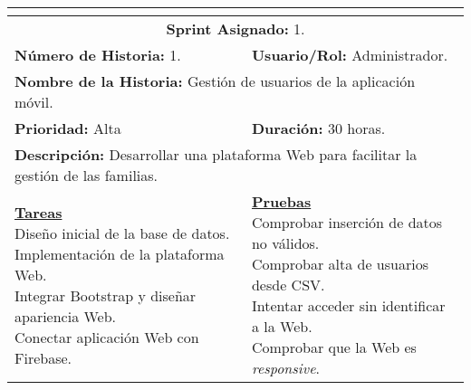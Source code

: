 \resizebox{15cm}{!} {
	\begin{tabular}{|l|l|}
		\hline
		\multicolumn{2}{|c|}{\cellcolor[HTML]{343434}{\color[HTML]{FFFFFF} \textbf{Historia de Usuario}}} \\
		\hline
		\multicolumn{2}{|c|}{\textbf{Sprint Asignado:} 1.} \\
		\hline
		\textbf{Número de Historia:} 1. & \textbf{Usuario/Rol:} Administrador.\\
		\hline
		\multicolumn{2}{|l|}{\textbf{Nombre de la Historia:} Gestión de usuarios de la aplicación móvil.} \\
		\hline
		\textbf{Prioridad:} Alta & \textbf{Duración:} 30 horas.\\
		\hline
		\multicolumn{2}{|l|}{\textbf{Descripción:} Desarrollar una plataforma Web para facilitar la gestión de las familias.} \\
		\hline
		\specialcell{\underline{\textbf{Tareas}} \\ Diseño inicial de la base de datos. \\ Implementación de la plataforma Web. \\ Integrar Bootstrap y diseñar apariencia Web. \\ Conectar aplicación Web con Firebase.} & \specialcell{\underline{\textbf{Pruebas}} \\ Comprobar inserción de datos no válidos. \\ Comprobar alta de usuarios desde \acs{CSV}. \\ Intentar acceder sin identificar a la Web. \\ Comprobar que la Web es \textit{responsive}.} \\
		\hline
	\end{tabular}
}